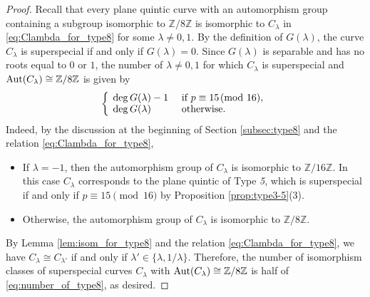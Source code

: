 \documentclass{article}
\theoremstyle{definition}
\begin{document}
\begin{proof}
Recall that every plane quintic curve with an automorphism group containing a subgroup isomorphic to $\mathbb{Z}/8\mathbb{Z}$ is isomorphic to $C_\lambda$ in \eqref{eq:Clambda_for_type8} for some $\lambda \neq 0,1$.
By the definition of $G(\lambda)$, the curve $C_\lambda$ is superspecial if and only if $G(\lambda)=0$.
Since $G(\lambda)$ is separable and has no roots equal to $0$ or $1$, the number of $\lambda \neq 0,1$ for which $C_\lambda$ is superspecial and ${\rm Aut}(C_\lambda) \cong \mathbb{Z}/8\mathbb{Z}$ is given by\vspace{-1mm}
\begin{equation}\label{eq:number_of_type8}
    \left\{
        \begin{array}{ll}
            \hspace{-0.3mm}\deg{G(\lambda)}-1 & \text{ if } p\equiv 15 \!\!\pmod{16},\\[-0.2mm]
            \hspace{-0.3mm}\deg{G(\lambda)} & \text{ otherwise}.
        \end{array}
    \right.\vspace{-1mm}
\end{equation}
Indeed, by the discussion at the beginning of Section \ref{subsec:type8} and the relation \eqref{eq:Clambda_for_type8},\vspace{-1.2mm}
\begin{itemize}
    \item If $\lambda = -1$, then the automorphism group of $C_\lambda$ is isomorphic to $\mathbb{Z}/16\mathbb{Z}$.
    In this case $C_\lambda$ corresponds to the plane quintic of Type \textit{5}, which is superspecial if and only if $p \equiv 15 \pmod{16}$ by Proposition \ref{prop:type3-5}(3).\vspace{-1.6mm}
    \item Otherwise, the automorphism group of $C_\lambda$ is isomorphic to $\mathbb{Z}/8\mathbb{Z}$.\vspace{-0.6mm}
\end{itemize}
By Lemma \ref{lem:isom_for_type8} and the relation \eqref{eq:Clambda_for_type8}, we have $C_\lambda \cong C_{\lambda'}$\hspace{-0.1mm} if and only if $\lambda' \in \{\lambda,1/\lambda\}$.
Therefore, the number of isomorphism classes of superspecial curves $C_\lambda$ with ${\rm Aut}(C_\lambda) \cong \mathbb{Z}/8\mathbb{Z}$ is half of \eqref{eq:number_of_type8}, as desired.
\end{proof}
\end{document}
